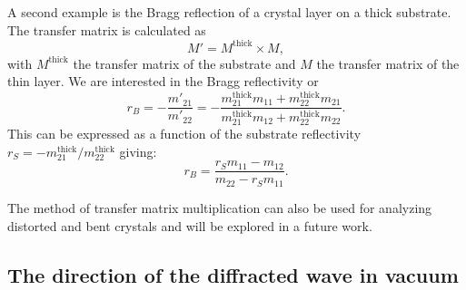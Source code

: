 \documentclass[preprint]{iucr}              %
\begin{document}
A second example is the Bragg reflection of a crystal layer on a thick substrate. The transfer matrix is calculated as
\begin{equation}
    M' = M^{\text{thick}} \times M,
\end{equation}
with $M^{\text{thick}}$ the transfer matrix of the substrate and $M$ the transfer matrix of the thin layer. We are interested in the Bragg reflectivity or 
\begin{equation}
r_B=-\frac{m'_{21}}{m'_{22}}=
-\frac{m_{21}^{\text{thick}} m_{11} + m_{22}^{\text{thick}} m_{21}}
{m_{21}^{\text{thick}} m_{12} + m_{22}^{\text{thick}} m_{22}}.
\end{equation}
This can be expressed as a function of the substrate reflectivity $r_S=-m_{21}^{\text{thick}}/m_{22}^{\text{thick}}$ giving: 
\begin{equation}
r_B=\frac{r_S m_{11} - m_{12}}
{m_{22}  - r_S m_{11}}.
\end{equation}

 The method of transfer matrix multiplication can also be used for analyzing distorted and bent crystals and will be explored in a future work.
 
\subsection{The direction of the diffracted wave in vacuum}\label{sec:directions}
\end{document}
